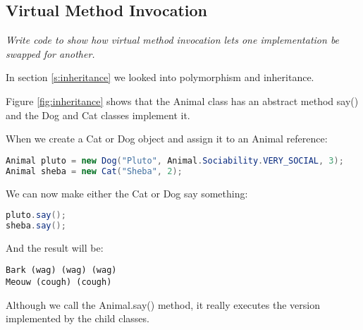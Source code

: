 \subsection{Virtual Method Invocation}
\textit{Write code to show how virtual method invocation lets one implementation be swapped for another.}

In section \ref{s:inheritance} we looked into polymorphism and inheritance.

Figure \ref{fig:inheritance} shows that the Animal class has an abstract method say() and the Dog and Cat classes implement it.

When we create a Cat or Dog object and assign it to an Animal reference:
\begin{lstlisting}[language=Java]
Animal pluto = new Dog("Pluto", Animal.Sociability.VERY_SOCIAL, 3);
Animal sheba = new Cat("Sheba", 2);
\end{lstlisting}

We can now make either the Cat or Dog say something:
\begin{lstlisting}[language=Java]
pluto.say();
sheba.say();
\end{lstlisting}
And the result will be:
\begin{lstlisting}
Bark (wag) (wag) (wag)
Meouw (cough) (cough)
\end{lstlisting}

Although we call the Animal.say() method, it really executes the version implemented by the child classes. 